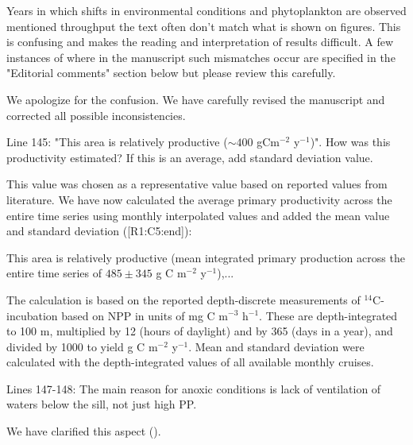 \documentclass[12pt,english]{reviewresponse}
\begin{document}
\begin{revcomment}
Years in which shifts in environmental conditions and phytoplankton are observed mentioned throughput the text often don't match what is shown on figures. This is confusing and makes the reading and interpretation of results difficult. A few instances of where in the manuscript such mismatches occur are specified in the "Editorial comments" section below but please review this carefully.
\end{revcomment}
\begin{revresponse}
	We apologize for the confusion. We have carefully revised the manuscript and corrected all possible inconsistencies.
\end{revresponse}



\begin{revcomment}
Line 145: "This area is relatively productive ($\sim 400$ gCm$^{-2}$ y$^{-1}$)". How was this productivity estimated? If this is an average, add standard deviation value.
\end{revcomment}
\begin{revresponse}
	This value was chosen as a representative value based on reported values from literature. We have now calculated the average primary productivity across the entire time series using monthly interpolated values and added the mean value and standard deviation ([R1:C5:end]):
    \begin{changes}
       This area is relatively productive (mean integrated primary production across the entire time series of $485 \pm 345$ g C m$^{-2}$ y$^{-1}$),...
    \end{changes}
    The calculation is based on the reported depth-discrete measurements of $^{14}$C-incubation based on NPP in units of mg C m$^{-3}$ h$^{-1}$. These are depth-integrated to 100 m, multiplied by 12 (hours of daylight) and by 365 (days in a year), and divided by 1000 to yield g C m$^{-2}$ y$^{-1}$. Mean and standard deviation were calculated with the depth-integrated values of all available monthly cruises.
\end{revresponse}

\begin{revcomment}
Lines 147-148: The main reason for anoxic conditions is lack of ventilation of waters below the sill, not just high PP.
\end{revcomment}
\begin{revresponse}
	We have clarified this aspect ().
\end{revresponse}
\end{document}
